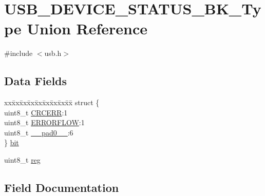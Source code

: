 \hypertarget{union_u_s_b___d_e_v_i_c_e___s_t_a_t_u_s___b_k___type}{}\section{U\+S\+B\+\_\+\+D\+E\+V\+I\+C\+E\+\_\+\+S\+T\+A\+T\+U\+S\+\_\+\+B\+K\+\_\+\+Type Union Reference}
\label{union_u_s_b___d_e_v_i_c_e___s_t_a_t_u_s___b_k___type}


{\ttfamily \#include $<$usb.\+h$>$}

\subsection*{Data Fields}
\begin{DoxyCompactItemize}
\item 
\begin{tabbing}
xx\=xx\=xx\=xx\=xx\=xx\=xx\=xx\=xx\=\kill
struct \{\\
\>uint8\_t \mbox{\hyperlink{union_u_s_b___d_e_v_i_c_e___s_t_a_t_u_s___b_k___type_a9a5185c85ce19eb51127ea4207839f1d}{CRCERR}}:1\\
\>uint8\_t \mbox{\hyperlink{union_u_s_b___d_e_v_i_c_e___s_t_a_t_u_s___b_k___type_ab1509dd1f780da84c5187a5d977aca9a}{ERRORFLOW}}:1\\
\>uint8\_t \mbox{\hyperlink{union_u_s_b___d_e_v_i_c_e___s_t_a_t_u_s___b_k___type_a8b4eebe79ded0459acec2f4950102ba3}{\_\_pad0\_\_}}:6\\
\} \mbox{\hyperlink{union_u_s_b___d_e_v_i_c_e___s_t_a_t_u_s___b_k___type_a93e902ff787a0e36893bd2eb2147b0d2}{bit}}\\

\end{tabbing}\item 
uint8\+\_\+t \mbox{\hyperlink{union_u_s_b___d_e_v_i_c_e___s_t_a_t_u_s___b_k___type_a9428adc9af4653a2050e2536b55dec8d}{reg}}
\end{DoxyCompactItemize}


\subsection{Field Documentation}
\mbox{\label{union_u_s_b___d_e_v_i_c_e___s_t_a_t_u_s___b_k___type_a8b4eebe79ded0459acec2f4950102ba3}} 
